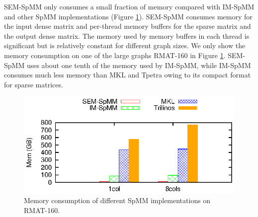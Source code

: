 SEM-SpMM only consumes a small fraction of memory compared with IM-SpMM and
other SpMM implementations (Figure \ref{perf:spmm_mem}). SEM-SpMM consumes
memory for the input dense matrix and per-thread memory buffers for the sparse
matrix and the output dense matrix. The memory used by memory buffers
in each thread is significant
but is relatively constant for different graph sizes. We only show the memory
consumption on one of the large graphs RMAT-160 in Figure \ref{perf:spmm_mem}.
SEM-SpMM uses about one tenth of the memory used by IM-SpMM, while IM-SpMM
consumes much less memory than MKL and Tpetra owing to its compact format for
sparse matrices.

\begin{figure}
	\begin{center}
		\footnotesize
		\includegraphics[scale=1]{SpMM_figs/SpMM-mem.eps}
		\caption{Memory consumption of different SpMM implementations on
		RMAT-160.}
		\label{perf:spmm_mem}
	\end{center}
\end{figure}

